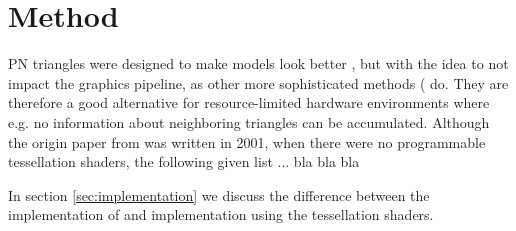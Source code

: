 
\section{Method}


PN triangles were designed to make models look better , but with the idea to not impact the graphics pipeline, as other more sophisticated methods ( do. They are therefore a good alternative for resource-limited hardware environments where e.g. no information about neighboring triangles can be accumulated. Although the origin paper from \citeauthor{vlachos2001curved}\textcite{vlachos2001curved} was written in 2001, when there were no programmable tessellation shaders, the following given list ... bla bla bla 


In section \ref{sec:implementation} we discuss the difference between the implementation of \citeauthor{vlachos2001curved} and implementation using the tessellation shaders.








